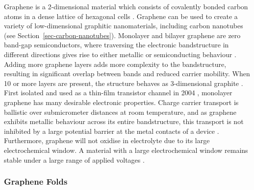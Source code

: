 \documentclass[
  a4paper,
]{scrbook}
\begin{document}
Graphene is a 2-dimensional material which consists of covalently bonded
carbon atoms in a dense lattice of hexagonal cells
\autocite{McEuen2002,Novoselov2004,Geim2007,Tran2016}. Graphene can be
used to create a variety of low-dimensional graphitic nanomaterials,
including carbon nanotubes \autocite{McEuen2002} (see
Section~\ref{sec-carbon-nanotubes}). Monolayer and bilayer graphene are
zero band-gap semiconductors, where traversing the electronic
bandstructure in different directions gives rise to either metallic or
semiconducting behaviour \autocite{McEuen2002,Peng2018}. Adding more
graphene layers adds more complexity to the bandstructure, resulting in
significant overlap between bands and reduced carrier mobility. When 10
or more layers are present, the structure behaves as 3-dimensional
graphite \autocite{Geim2007,Ohno2015}. First isolated and used as a
thin-film transistor channel in 2004 \autocite{Novoselov2004}, monolayer
graphene has many desirable electronic properties. Charge carrier
transport is ballistic over submicrometer distances at room temperature,
and as graphene exhibits metallic behaviour across its entire
bandstructure, this transport is not inhibited by a large potential
barrier at the metal contacts of a device
\autocite{Novoselov2004,Geim2007,Peng2018}. Furthermore, graphene will
not oxidise in electrolyte due to its large electrochemical window. A
material with a large electrochemical window remains stable under a
large range of applied voltages \autocite{Ohno2015,Tran2016}.

\hypertarget{graphene-folds}{%
\subsubsection*{Graphene Folds}\label{graphene-folds}}
\end{document}
